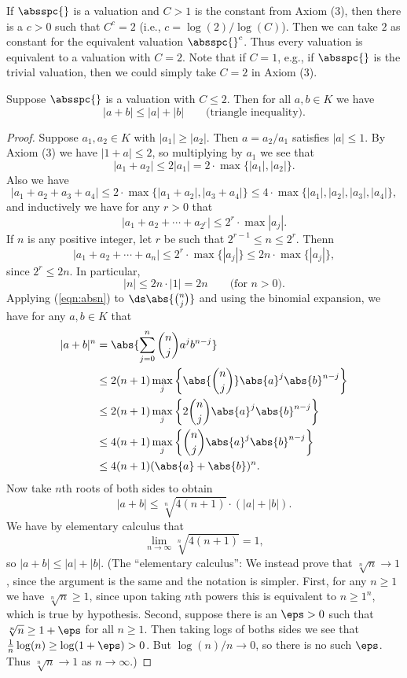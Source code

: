 If $\absspc{}$ is a valuation and $C>1$ is the constant from Axiom
(3), then there is a $c>0$ such that $C^c=2$ (i.e.,
$c=\log(2)/\log(C)$).  Then we can take $2$ as constant for the
equivalent valuation $\absspc{}^c$.  Thus every valuation is
equivalent to a valuation with $C=2$. Note that if $C=1$, e.g.,
if $\absspc{}$ is the trivial valuation, then we could
simply take $C=2$ in Axiom (3).
\begin{proposition}
Suppose $\absspc{}$ is a valuation with $C\leq 2$.
Then for all $a, b\in K$ we have 
\begin{equation}\label{val3p}
  |a + b| \leq |a| + |b|\qquad \text{(triangle inequality)}.
\end{equation}
\end{proposition}
\begin{proof}
Suppose $a_1, a_2\in K$ with $|a_1|\geq|a_2|$.  Then $a=a_2/a_1$
satisfies $|a|\leq 1$.  By Axiom (3) we have $|1+a|\leq 2$, so
multiplying by $a_1$ we see that
$$|a_1+ a_2|\leq 2|a_1| = 2\cdot\max\{|a_1|,|a_2|\}.$$
Also we have 
$$|a_1+ a_2 + a_3 + a_4|\leq 2\cdot\max\{|a_1+a_2|,|a_3+a_4|\}
   \leq 4\cdot \max\{|a_1|,|a_2|,|a_3|,|a_4|\},
$$
and inductively we have for any $r>0$ that
$$|a_1 + a_2 + \cdots  + a_{2^r}| \leq 2^r\cdot\max{|a_j|}.$$
If $n$ is any positive integer, let $r$ be such
that $2^{r-1}\leq n\leq 2^r$. Thenn
$$|a_1 + a_2 + \cdots + a_{n}| \leq 2^r\cdot \max\{|a_j|\} 
 \leq 2n\cdot \max\{|a_j|\},$$
since $2^r\leq 2n$.  In particular,
\begin{equation}\label{eqn:absn}
  |n| \leq 2n\cdot |1| = 2n \qquad\text{(for $n>0$)}.
\end{equation}
Applying (\ref{eqn:absn}) to $\ds\abs{\binom{n}{j}}$ and using
the binomial expansion, we have for any $a,b\in K$ that
\begin{align*}
|a+b|^n &= \abs{\sum_{j=0}^n \binom{n}{j} a^j b^{n-j}}\\
   &\leq  2(n+1)\max_j\left\{ \abs{\binom{n}{j}} \abs{a}^j\abs{b}^{n-j}\right\}\\
   &\leq  2(n+1)\max_j\left\{ 2 \binom{n}{j} \abs{a}^j\abs{b}^{n-j}\right\}\\
   &\leq  4(n+1)\max_j\left\{ \binom{n}{j} \abs{a}^j\abs{b}^{n-j}\right\}\\
   &\leq  4(n+1)(\abs{a}+\abs{b})^n.
\end{align*}
Now take $n$th roots of both sides to obtain
$$
|a+b| \leq \sqrt[n]{4(n+1)}\cdot (|a| + |b|).
$$
We have by elementary calculus that
$$
  \lim_{n\to \infty} \sqrt[n]{4(n+1)} = 1,
$$ so $|a+b| \leq |a|+|b|$.  
(The ``elementary calculus'': We instead prove that $\sqrt[n]{n}\to 1$, since
the argument is the same and the notation is simpler.  First, for any
$n\geq 1$ we have $\sqrt[n]{n}\geq 1$, since upon taking $n$th powers
this is equivalent to $n\geq 1^n$, which is true by hypothesis.
Second, suppose there is an $\eps>0$ such that $\sqrt[n]{n}\geq
1+\eps$ for all $n\geq 1$.  Then taking logs of boths sides we see
that $\frac{1}{n}\log(n)\geq \log(1+\eps) > 0$.  But 
 $\log(n)/n\to 0$, so there is no such $\eps$.  Thus
$\sqrt[n]{n}\to 1$ as $n\to \infty$.)
\end{proof}
